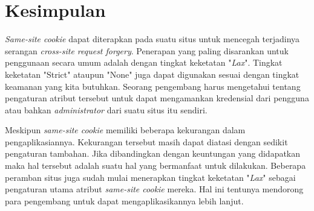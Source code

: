 \documentclass{article}
\begin{document}
\section{Kesimpulan}
\textit{Same-site cookie} dapat diterapkan pada suatu situs untuk mencegah terjadinya serangan \textit{cross-site request forgery}. Penerapan yang paling disarankan untuk penggunaan secara umum adalah dengan tingkat keketatan "\textit{Lax}". Tingkat keketatan "Strict" ataupun "None" juga dapat digunakan sesuai dengan tingkat keamanan yang kita butuhkan. Seorang pengembang harus mengetahui tentang pengaturan atribut tersebut untuk dapat mengamankan kredensial dari pengguna atau bahkan \textit{administrator} dari suatu situs itu sendiri.

Meskipun \textit{same-site cookie} memiliki beberapa kekurangan dalam pengaplikasiannya. Kekurangan tersebut masih dapat diatasi dengan sedikit pengaturan tambahan. Jika dibandingkan dengan keuntungan yang didapatkan maka hal tersebut adalah suatu hal yang bermanfaat untuk dilakukan. Beberapa peramban situs juga sudah mulai menerapkan tingkat keketatan "\textit{Lax}" sebagai pengaturan utama atribut \textit{same-site cookie} mereka. Hal ini tentunya mendorong para pengembang untuk dapat mengaplikasikannya lebih lanjut.


\begin{onehalfspacing}

\end{onehalfspacing}
\end{document}
